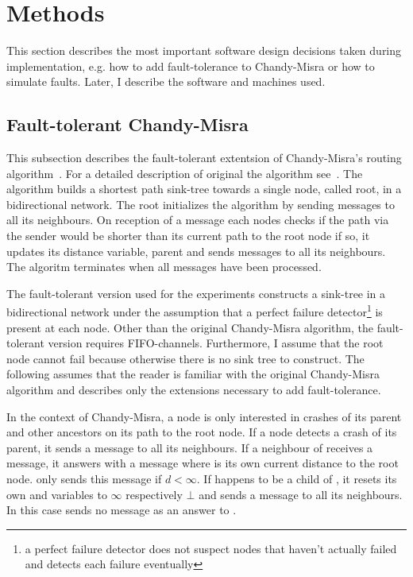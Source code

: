 \section{Methods}
\label{sec:methods}
This section describes the most important software design decisions taken during implementation, e.g. how to add fault-tolerance to Chandy-Misra or how to simulate faults.
Later, I describe the software and machines used.

\subsection {Fault-tolerant Chandy-Misra}
\label{ssec:fault-tolerant-chandy-misra}
This subsection describes the fault-tolerant extentsion of Chandy-Misra's routing algorithm~\cite{chandy1982}. 
For a detailed description of original the algorithm see~\cite[page 56]{fokkink:2018}.
The algorithm builds a shortest path sink-tree towards a single node, called root, in a bidirectional network.
The root initializes the algorithm by sending  messages to all its neighbours.
On reception of a  message each nodes checks if the path via the sender would be shorter than its current path to the root node if so, it updates its distance variable, parent and sends  messages to all its neighbours.
The algoritm terminates when all  messages have been processed. 

The fault-tolerant version used for the experiments constructs a sink-tree in a bidirectional network under the assumption that a perfect failure detector\footnote{a perfect failure detector does not suspect nodes that haven't actually failed and detects each failure eventually} is present at each node.
Other than the original Chandy-Misra algorithm, the fault-tolerant version requires FIFO-channels.
Furthermore, I assume that the root node cannot fail because otherwise there is no sink tree to construct.
The following assumes that the reader is familiar with the original Chandy-Misra algorithm and describes only the extensions necessary to add fault-tolerance.

In the context of Chandy-Misra, a node is only interested in crashes of its parent and other ancestors on its path to the root node.
If a node  detects a crash of its parent, it sends a  message to all its neighbours.
If a neighbour  of  receives a  message, it answers with a  message where  is its own current distance to the root node.
 only sends this message if $d < \infty $.
If  happens to be a child of , it resets its own  and  variables to $\infty$ respectively $\bot$ and sends a  message to all its neighbours.
In this case  sends no  message as an answer to .

